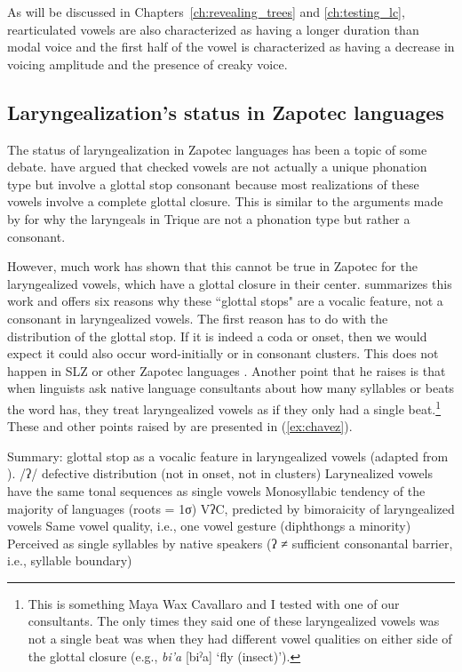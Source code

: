 As will be discussed in Chapters~\ref{ch:revealing_trees} and \ref{ch:testing_lc}, rearticulated vowels are also characterized as having a longer duration than modal voice and the first half of the vowel is characterized as having a decrease in voicing amplitude and the presence of creaky voice.
\subsection{Laryngealization's status in Zapotec languages} \label{sec:laryngeal_status}

The status of laryngealization in Zapotec languages has been a topic of some debate. \citet{avelinoAcousticElectroglottographicAnalyses2010,espositoSantaAnaValle2004} have argued that checked vowels are not actually a unique phonation type but involve a glottal stop consonant because most realizations of these vowels involve a complete glottal closure. This is similar to the arguments made by \citet{dicanioCoarticulationToneGlottal2012,dicanioCueWeightPerception2014} for why the laryngeals in Trique are not a phonation type but rather a consonant. 

However, much work has shown that this cannot be true in Zapotec for the laryngealized vowels, which have a glottal closure in their center. \citet{chavez-peonInteractionMetricalStructure2010} summarizes this work and offers six reasons why these ``glottal stops" are a vocalic feature, not a consonant in laryngealized vowels. The first reason has to do with the distribution of the glottal stop. If it is indeed a coda or onset, then we would expect it could also occur word-initially or in consonant clusters. This does not happen in SLZ or other Zapotec languages \citep{jaegerInitialConsonantClusters1982}. Another point that he raises is that when linguists ask native language consultants about how many syllables or beats the word has, they treat laryngealized vowels as if they only had a single beat.\footnote{This is something Maya Wax Cavallaro and I tested with one of our consultants. The only times they said one of these laryngealized vowels was not a single beat was when they had different vowel qualities on either side of the glottal closure (e.g., \textit{bi'a} [biˀa] `fly (insect)').} These and other points raised by \citeauthor{chavez-peonInteractionMetricalStructure2010} are presented in (\ref{ex:chavez}). 

\ea  Summary: glottal stop as a vocalic feature in laryngealized vowels (adapted from \cite{chavez-peonInteractionMetricalStructure2010}). \label{ex:chavez}
    \ea /ʔ/ defective distribution (not in onset, not in clusters)
    \ex Larynealized vowels have the same tonal sequences as single vowels
    \ex Monosyllabic tendency of the majority of languages (roots = 1σ)
    \ex *VʔC, predicted by bimoraicity of laryngealized vowels
    \ex Same vowel quality, i.e., one vowel gesture (diphthongs a minority)
    \ex Perceived as single syllables by native speakers (ʔ ≠ sufficient consonantal barrier, i.e., syllable boundary)
    \z 
\z 


